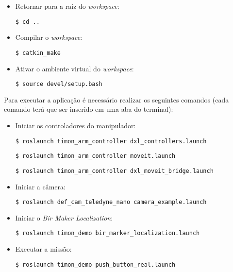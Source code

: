 \begin{itemize}
  \item Retornar para a raiz do \textit{workspace}:
  \begin{lstlisting}[frame=single]
    $ cd ..
  \end{lstlisting}
  \item Compilar o \textit{workspace}:
  \begin{lstlisting}[frame=single]
    $ catkin_make
  \end{lstlisting}
  \item Ativar o ambiente virtual do \textit{workspace}:
  \begin{lstlisting}[frame=single]
    $ source devel/setup.bash
  \end{lstlisting}
\end{itemize}

Para executar a aplicação é necessário realizar os seguintes comandos (cada comando terá que ser inserido em uma aba do terminal):

\begin{itemize}
  \item Iniciar os controladores do manipulador:
  \begin{lstlisting}[frame=single]
    $ roslaunch timon_arm_controller dxl_controllers.launch
  \end{lstlisting}
  \begin{lstlisting}[frame=single]
    $ roslaunch timon_arm_controller moveit.launch
  \end{lstlisting}
  \begin{lstlisting}[frame=single]
    $ roslaunch timon_arm_controller dxl_moveit_bridge.launch
  \end{lstlisting}

  \item Iniciar a câmera:
  \begin{lstlisting}[frame=single]
    $ roslaunch def_cam_teledyne_nano camera_example.launch
  \end{lstlisting}

  \item Iniciar o \textit{Bir Maker Localization}:
  \begin{lstlisting}[frame=single]
    $ roslaunch timon_demo bir_marker_localization.launch
  \end{lstlisting}
  
  \item Executar a missão:
  \begin{lstlisting}[frame=single]
    $ roslaunch timon_demo push_button_real.launch
  \end{lstlisting}
\end{itemize}